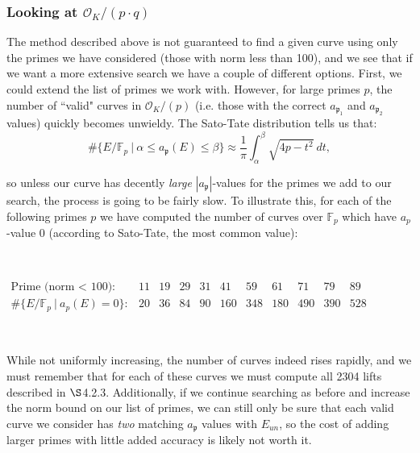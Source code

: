 \subsubsection{Looking at $\mathcal{O}_K/(p\cdot q)$}

The method described above is not guaranteed to find a given curve using only the primes we have considered (those with norm less than 100), and we see that if we want a more extensive search we have a couple of different options. First, we could extend the list of primes we work with. However, for large primes $p$, the number of ``valid" curves in $\mathcal{O}_K/(p)$ (i.e. those with the correct $a_{\mathfrak{p}_1}$ and $a_{\mathfrak{p}_2}$ values) quickly becomes unwieldy. The Sato-Tate distribution tells us that:
\begin{equation}
\#\{E/{\mathbb{F}_p} \ | \ \alpha \leq a_\mathfrak{p}(E) \leq \beta\} \approx \frac{1}{\pi}\int_{\alpha}^{\beta}\sqrt{4p-t^2} \ dt, \nonumber
\end{equation}

\noindent so unless our curve has decently \emph{large} $|a_\mathfrak{p}|$-values for the primes we add to our search, the process is going to be fairly slow. To illustrate this, for each of the following primes $p$ we have computed the number of curves over $\mathbb{F}_p$ which have $a_p$-value 0 (according to Sato-Tate, the most common value):

\

$\begin{array}{ccccccccccc}
\text{Prime (norm $<$ 100): \ }&11&19&29&31&41&59&61&71&79&89\\
\#\{E/{\mathbb{F}_p} \ | \ a_p(E) = 0\}:&20&36&84&90&160&348&180&490&390&528
\end{array}$

\

\noindent While not uniformly increasing, the number of curves indeed rises rapidly, and we must remember that for each of these curves we must compute all 2304 lifts described in $\S$4.2.3. Additionally, if we continue searching as before and increase the norm bound on our list of primes, we can still only be sure that each valid curve we consider has \emph{two} matching $a_\mathfrak{p}$ values with $E_{un}$, so the cost of adding larger primes with little added accuracy is likely not worth it.

